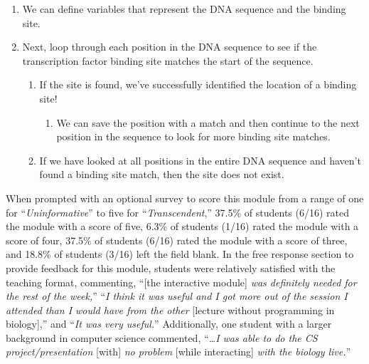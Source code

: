 \begin{enumerate}
\begin{enumerate}
        \item We can define variables that represent the DNA sequence and the binding site. 
        \item Next, loop through each position in the DNA sequence to see if the transcription factor binding site matches the start of the sequence. 
        \begin{enumerate}
            \item If the site is found, we've successfully identified the location of a binding site! 
            \begin{enumerate}
                \item We can save the position with a match and then continue to the next position in the sequence to look for more binding site matches. 
            \end{enumerate}
            \item If we have looked at all positions in the entire DNA sequence and haven't found a binding site match, then the site does not exist. 
        \end{enumerate}
    \end{enumerate}
\end{enumerate}

\par\noindent\dotfill

When prompted with an optional survey to score this module from a range of one for “\textit{Uninformative}” to five for “\textit{Transcendent},” 37.5\% of students (6/16) rated the module with a score of five, 6.3\% of students (1/16) rated the module with a score of four, 37.5\% of students (6/16) rated the module with a score of three, and 18.8\% of students (3/16) left the field blank. In the free response section to provide feedback for this module, students were relatively satisfied with the teaching format, commenting, “[the interactive module] \textit{was definitely needed for the rest of the week,}” “\textit{I think it was useful and I got more out of the session I attended than I would have from the other} [lecture without programming in biology],” and “\textit{It was very useful.}” Additionally, one student with a larger background in computer science commented, “\textit{…I was able to do the CS project/presentation} [with] \textit{no problem} [while interacting] \textit{with the biology live.}” 

